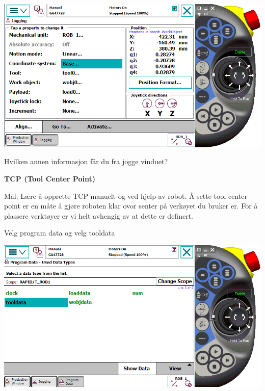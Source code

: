 \vspace{1cm}

\includegraphics[width=1\textwidth]{i04861x05}

\vspace{1cm}

Hvilken annen informasjon får du fra jogge vinduet?

\vspace{1cm}


\textbf{TCP (Tool Center Point)}

\vspace{1cm}

Mål: Lære å opprette TCP manuelt og ved hjelp av robot.
\vskip 5pt 
Å sette tool center point er en måte å gjøre roboten klar  ovor senter på verkøyet du bruker er. For å plassere verktøyer er vi helt avhengig av at dette er definert. 

\vspace{1cm}

Velg program data og velg tooldata

\vspace{1cm}

\includegraphics[width=1\textwidth]{i04861x06}

